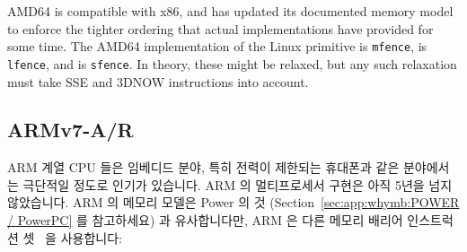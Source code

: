AMD64 is compatible with x86, and has updated its documented memory
model~\cite{AMDOpteron:2:2007}
to enforce the tighter ordering that actual implementations have
provided for some time.
The AMD64 implementation of the Linux  primitive is {\tt mfence},
 is {\tt lfence}, and  is {\tt sfence}.
In theory, these might be relaxed, but any such relaxation must take
SSE and 3DNOW instructions into account.
\fi

\subsection{ARMv7-A/R}

ARM 계열 CPU 들은 임베디드 분야, 특히 전력이 제한되는 휴대폰과 같은 분야에서는
극단적일 정도로 인기가 있습니다.
ARM 의 멀티프로세서 구현은 아직 5년을 넘지 않았습니다.
ARM 의 메모리 모델은 Power 의 것 (Section~\ref{sec:app:whymb:POWER / PowerPC}
를 참고하세요) 과 유사합니다만, ARM 은 다른 메모리 배리어 인스트럭션
셋~\cite{ARMv7A:2010} 을 사용합니다:

